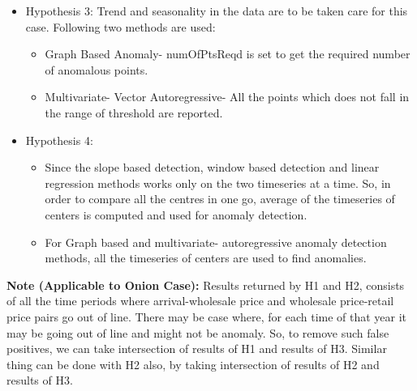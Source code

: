 \begin{itemize}
\item Hypothesis 3: Trend and seasonality in the data are to be taken care for this case. Following two methods are used:
    \begin{itemize}
      \item Graph Based Anomaly- numOfPtsReqd is set to get the required number of anomalous points.
      \item Multivariate- Vector Autoregressive- All the points which does not fall in the range of threshold are reported.
    \end{itemize}
    
\item Hypothesis 4:
    \begin{itemize}
      \item Since the slope based detection, window based detection and linear regression methods works only on the two timeseries at a time. So, in order to compare all the centres in one go, average of the timeseries of centers is computed and used for anomaly detection. 
      \item For Graph based and multivariate- autoregressive anomaly detection methods, all the timeseries of centers are used to find anomalies.
    \end{itemize}
    

\end{itemize}

\textbf{Note (Applicable to Onion Case):} Results returned by H1 and H2, consists of all the time periods where arrival-wholesale price and wholesale price-retail price pairs go out of line. There may be case where, for each time of that year it may be going out of line and might not be anomaly. So, to remove such false positives, we can take intersection of results of H1 and results of H3. Similar thing can be done with H2 also, by taking  intersection of results of H2 and results of H3.

